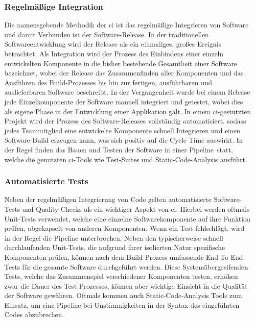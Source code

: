 \subsubsection{Regelmäßige Integration}

Die namensgebende Methodik der \acrshort{ci} ist das regelmäßige Integrieren von Software und damit Verbunden ist der
Software-Release.
In der traditionellen Softwareentwicklung wird der Release als ein einmaliges, großes Ereignis betrachtet.
Als Integration wird der Prozess des Einbindens einer einzeln entwickelten Komponente in die bisher bestehende
Gesamtheit einer Software bezeichnet, wobei der Release das Zusammenfinden aller Komponenten und das Ausführen des
Build-Prozesses bis hin zur fertigen, ausführbaren und auslieferbaren Software beschreibt.
In der Vergangenheit wurde bei einem Release jede Einzelkomponente der Software manuell integriert und getestet, wobei
dies als eigene Phase in der Entwicklung einer Applikation galt.
In einem \acrshort{ci}-gestützten Projekt wird der Prozess des Software-Releases vollständig automatisiert, sodass jedes
Teammitglied eine entwickelte Komponente schnell Integrieren und einen Software-Build erzeugen kann, was sich positiv
auf die Cycle Time auswirkt.
In der Regel finden das Bauen und Testen der Software in einer \glqq Pipeline\grqq\ statt, welche die genutzten
\acrshort{ci}-Tools wie Test-Suites und Static-Code-Analysis ausführt.

\subsubsection{Automatisierte Tests}

Neben der regelmäßigen Integrierung von Code gelten automatisierte Software-Tests und Quality-Checks als ein wichtiger
Aspekt von \acrshort{ci}.
Hierbei werden oftmals Unit-Tests verwendet, welche eine einzelne Softwarekomponente auf
ihre Funktion prüfen, abgekapselt von anderen Komponenten.
Wenn ein Test fehlschlägt, wird in der Regel die Pipeline unterbrochen.
Neben den typischerweise schnell durchlaufenden Unit-Tests, die aufgrund ihrer isolierten Natur spezifische Komponenten
prüfen, können nach dem Build-Prozess umfassende End-To-End-Tests für die gesamte Software durchgeführt werden.
Diese Systemübergreifenden Tests, welche das Zusammenspiel verschiedener Komponenten testen, erhöhen zwar die Dauer des
Test-Prozesses, können aber wichtige Einsicht in die Qualität der Software gewähren.
Oftmals kommen auch Static-Code-Analysis Tools zum Einsatz, um eine Pipeline bei Unstimmigkeiten in der Syntax des
eingeführten Codes abzubrechen.

